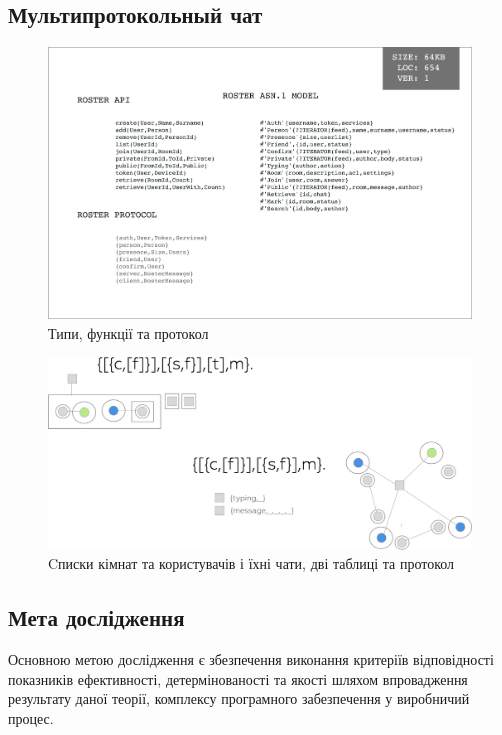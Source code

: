 \documentclass[11pt,oneside]{article}
\begin{document}
\newpage
\subsection{Мультипротокольный чат}

\begin{figure}[h!]
\centering
\includegraphics[scale=0.1]{img/exe-roster-api}
\caption{Типи, функції та протокол}
\end{figure}

\begin{figure}[h!]
\centering
\includegraphics[scale=0.3]{img/exe-roster}
\caption{Cписки кімнат та користувачів і їхні чати, дві таблиці та протокол}
\end{figure}


\newpage

\subsection{Мета дослідження}
\vspace{0.5cm}
   Основною метою дослідження є збезпечення виконання критеріїв відповідності
   показників ефективності, детермінованості та якості шляхом впровадження
   результату даної теорії, комплексу програмного забезпечення у виробничий процес.
\end{document}
